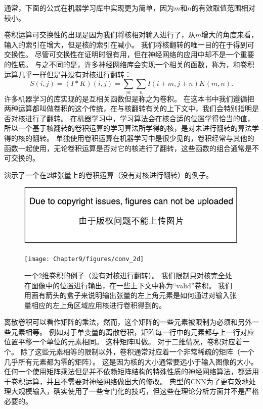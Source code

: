 通常，下面的公式在机器学习库中实现更为简单，因为$m$和$n$的有效取值范围相对较小。

 
卷积运算可交换性的出现是因为我们将核相对输入进行了，从$m$增大的角度来看，输入的索引在增大，但是核的索引在减小。
我们将核翻转的唯一目的在于得到可交换性。
尽管可交换性在证明时很有用，但在神经网络的应用中却不是一个重要的性质。
与之不同的是，许多神经网络库会实现一个相关的函数，称为，和卷积运算几乎一样但是并没有对核进行翻转：
\begin{equation}
S(i, j) = (I*K)(i, j) = \sum_m \sum_n I(i+m, j+n) K(m, n).
\end{equation}
许多机器学习的库实现的是互相关函数但是称之为卷积。
在这本书中我们遵循把两种运算都叫做卷积的这个传统，在与核翻转有关的上下文中，我们会特别指明是否对核进行了翻转。
在机器学习中，学习算法会在核合适的位置学得恰当的值， 所以一个基于核翻转的卷积运算的学习算法所学得的核，是对未进行翻转的算法学得的核的翻转。
单独使用卷积运算在机器学习中是很少见的，卷积经常与其他的函数一起使用，无论卷积运算是否对它的核进行了翻转，这些函数的组合通常是不可交换的。

演示了一个在2维张量上的卷积运算（没有对核进行翻转）的例子。
\begin{figure}[!htb]
\ifOpenSource
\centerline{\includegraphics{figure.pdf}}
\else
\centerline{\texttt{[image: Chapter9/figures/conv\_2d]}}
\fi
\caption{一个2维卷积的例子（没有对核进行翻转）。
我们限制只对核完全处在图像中的位置进行输出，在一些上下文中称为``\gls{valid}''卷积。
我们用画有箭头的盒子来说明输出张量的左上角元素是如何通过对输入张量相应的左上角区域应用核进行卷积得到的。}
\label{fig:chap9_conv_2d}
\end{figure}

离散卷积可以看作矩阵的乘法，然而，这个矩阵的一些元素被限制为必须和另外一些元素相等。
例如对于单变量的离散卷积，矩阵每一行中的元素都与上一行对应位置平移一个单位的元素相同。
这种矩阵叫做。
对于二维情况，卷积对应着一个。
除了这些元素相等的限制以外，卷积通常对应着一个非常稀疏的矩阵（一个几乎所有元素都为零的矩阵）。
这是因为核的大小通常要远小于输入图像的大小。任何一个使用矩阵乘法但是并不依赖矩阵结构的特殊性质的神经网络算法，都适用于卷积运算，并且不需要对神经网络做出大的修改。
典型的\gls{CNN}为了更有效地处理大规模输入，确实使用了一些专门化的技巧，但这些在理论分析方面并不是严格必要的。

